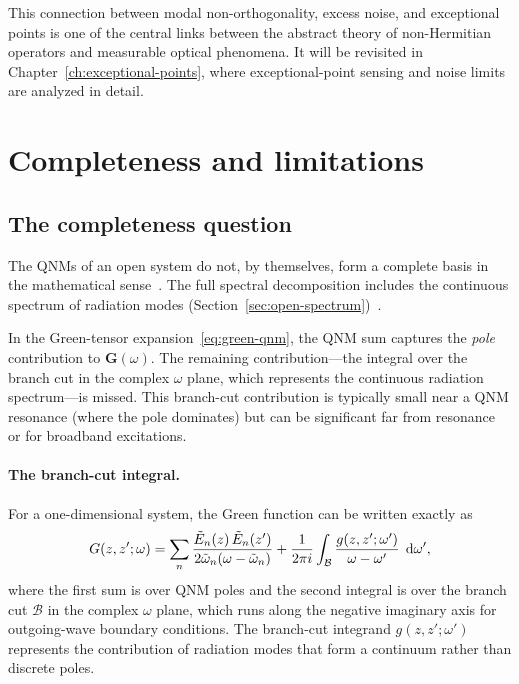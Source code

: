 This connection between modal non-orthogonality, excess noise, and
exceptional points is one of the central links between the abstract
theory of non-Hermitian operators and measurable optical phenomena. It
will be revisited in Chapter~\ref{ch:exceptional-points}, where
exceptional-point sensing and noise limits are analyzed in detail.


\section{Completeness and limitations}
\label{sec:qnm-completeness}

\subsection{The completeness question}
\label{ssec:qnm-completeness-question}

The QNMs of an open system do not, by themselves, form a complete basis
in the mathematical sense~\cite{wu2024frontiers,opg2023dispersive,lasson2014roundtrip}. The full spectral decomposition includes the
continuous spectrum of radiation modes
(Section~\ref{sec:open-spectrum})~\cite{vial2014quasimodal}.

In the Green-tensor expansion~\eqref{eq:green-qnm}, the QNM sum captures
the \emph{pole} contribution to $\mathbf{G}(\omega)$. The remaining
contribution---the integral over the branch cut in the complex $\omega$
plane, which represents the continuous radiation spectrum---is missed.
This branch-cut contribution is typically small near a QNM resonance
(where the pole dominates) but can be significant far from resonance or
for broadband excitations.

\paragraph{The branch-cut integral.}
For a one-dimensional system, the Green function can be written
exactly as
\begin{equation}
 G(z, z'; \omega) = \sum_n \frac{\tilde{E}_n(z)\,\tilde{E}_n(z')}
 {2\tilde{\omega}_n(\omega - \tilde{\omega}_n)}
 + \frac{1}{2\pi i}\int_{\mathcal{B}}
 \frac{g(z, z'; \omega')}{\omega - \omega'}\;\mathop{}\!\mathrm{d}\omega',
 \label{eq:green-complete}
\end{equation}
where the first sum is over QNM poles and the second integral is over
the branch cut $\mathcal{B}$ in the complex $\omega$ plane, which runs
along the negative imaginary axis for outgoing-wave boundary conditions.
The branch-cut integrand $g(z, z'; \omega')$ represents the contribution
of radiation modes that form a continuum rather than discrete poles.


